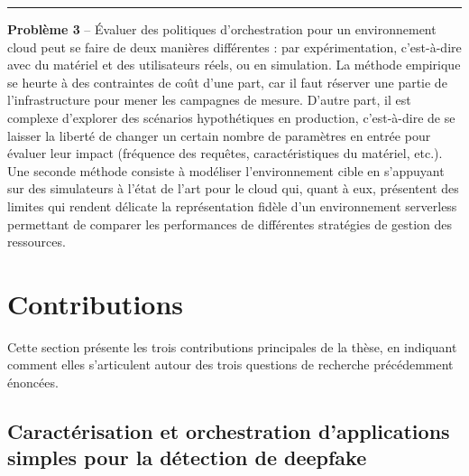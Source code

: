 
\begin{center}
    \rule{4cm}{0.4pt}
\end{center}

\textbf{Problème 3} -- Évaluer des politiques d'orchestration pour un environnement cloud peut se faire de deux manières différentes : par expérimentation, c'est-à-dire avec du matériel et des utilisateurs réels, ou en simulation. La méthode empirique se heurte à des contraintes de coût d'une part, car il faut réserver une partie de l'infrastructure pour mener les campagnes de mesure. D'autre part, il est complexe d'explorer des scénarios hypothétiques en production, c'est-à-dire de se laisser la liberté de changer un certain nombre de paramètres en entrée pour évaluer leur impact (fréquence des requêtes, caractéristiques du matériel, etc.). Une seconde méthode consiste à modéliser l'environnement cible en s'appuyant sur des simulateurs à l'état de l'art pour le cloud qui, quant à eux, présentent des limites qui rendent délicate la représentation fidèle d'un environnement serverless permettant de comparer les performances de différentes stratégies de gestion des ressources.


\section{Contributions}

Cette section présente les trois contributions principales de la thèse, en indiquant comment elles s'articulent autour des trois questions de recherche précédemment énoncées.

\subsection{Caractérisation et orchestration d'applications simples pour la détection de deepfake}

